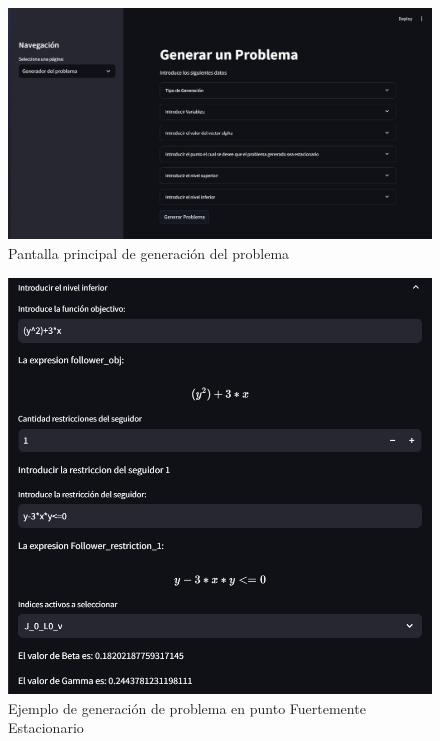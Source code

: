 \begin{figure}[H]
    \centering
    \includegraphics[width=\textwidth]{Graphics/front_streamlitpng.png}
    \caption{Pantalla principal de generación del problema}
    \label{fig:front_generator_page}
\end{figure}

\begin{figure}[H]
    \centering
    \includegraphics[width=\textwidth]{Graphics/Ejemplo_introducir_follower_rest.png}
    \caption{Ejemplo de generación de problema en punto Fuertemente Estacionario}
    \label{fig:example_strong_stationary_front_generator}
\end{figure}

